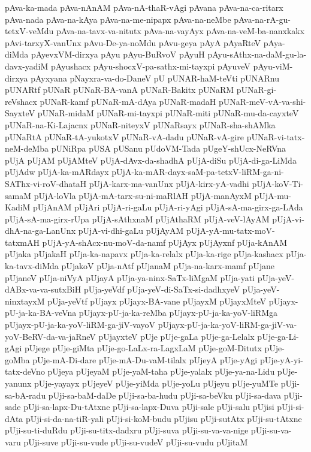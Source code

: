 {pAva-ka-mada
pAva-nAnAM
pAva-nA-thaR-vAgi
pAvana
pAva-na-ca-ritarx
pAva-nada
pAva-na-kAya
pAva-na-me-nipapx
pAva-na-neMbe
pAva-na-rA-gu-tetxV-veMdu
pAva-na-tavx-va-nitutx
pAva-na-vayAyx
pAva-na-veM-ba-nanxkakx
pAvi-tarxyX-vanUnx
pAvu-De-ya-noMdu
pAvu-geya
pAyA
pAyaRteV
pAya-diMda
pAyevxVM-dirxya
pAyu
pAyu-BuRvoV
pAyuH
pAyu-sAthx-na-daM-gu-la-davx-yadiM
pAyushacx
pAyu-shocxV-pa-sathx-mi-tayxpi
pAyuveV
pAyu-viM-dirxya
pAyxyana
pNayxra-va-do-DaneV
pU
pUNAR-haM-teVti
pUNARnu
pUNARtf
pUNaR
pUNaR-BA-vanA
pUNaR-Bakitx
pUNaRM
pUNaR-gi-reVshacx
pUNaR-kamf
pUNaR-mA-dAya
pUNaR-madaH
pUNaR-meV-vA-va-shi-SayxteV
pUNaR-midaM
pUNaR-mi-tayxpi
pUNaR-miti
pUNaR-mu-da-cayxteV
pUNaR-na-Ki-Lajacnx
pUNaR-niteyxV
pUNaRsayx
pUNaR-sha-shAMka
pUNaRtA
pUNaR-tA-yukotxV
pUNaR-vA-dadu
pUNaR-vA-gire
pUNaR-vi-tatx-neM-deMba
pUNiRpa
pUSA
pUSanu
pUdoVM-Tada
pUgeY-shUcx-NeRVna
pUjA
pUjAM
pUjAMteV
pUjA-dAvx-da-shadhA
pUjA-diSu
pUjA-di-ga-LiMda
pUjAdw
pUjA-ka-mARdayx
pUjA-ka-mAR-dayx-saM-pa-tetxV-liRM-ga-ni-SAThx-vi-roV-dhataH
pUjA-karx-ma-vanUnx
pUjA-kirx-yA-vadhi
pUjA-koV-Ti-samaM
pUjA-loVla
pUjA-mA-tarx-su-ni-maRlAH
pUjA-manAyxM
pUjA-mu-KadiM
pUjAnAM
pUjAri
pUjA-ri-gaLu
pUjA-ri-yAgi
pUjA-sA-ma-girx-ga-LAda
pUjA-sA-ma-girx-rUpa
pUjA-sAthxnaM
pUjAthaRM
pUjA-veV-lAyAM
pUjA-vi-dhA-na-ga-LanUnx
pUjA-vi-dhi-gaLu
pUjAyAM
pUjA-yA-mu-tatx-moV-tatxmAH
pUjA-yA-shAcx-nu-moV-da-namf
pUjAyx
pUjAyxnf
pUja-kAnAM
pUjaka
pUjakaH
pUja-ka-napavx
pUja-ka-relalx
pUja-ka-rige
pUja-kashacx
pUja-ka-tavx-diMda
pUjakoV
pUja-nAtf
pUjanaM
pUja-na-karx-mamf
pUjane
pUjaneV
pUja-niVyA
pUjayA
pUja-ya-ninx-SaTx-liMgaM
pUja-yati
pUja-yeV-dABx-va-va-sutxBiH
pUja-yeVdf
pUja-yeV-di-SaTx-si-dadhxyeV
pUja-yeV-ninxtayxM
pUja-yeVtf
pUjayx
pUjayx-BA-vane
pUjayxM
pUjayxMteV
pUjayx-pU-ja-ka-BA-veVna
pUjayx-pU-ja-ka-reMba
pUjayx-pU-ja-ka-yoV-liRMga
pUjayx-pU-ja-ka-yoV-liRM-ga-jiV-vayoV
pUjayx-pU-ja-ka-yoV-liRM-ga-jiV-va-yoV-BeRV-da-va-jaRneV
pUjayxteV
pUje
pUje-gaLa
pUje-ga-Lelalx
pUje-ga-Li-gAgi
pUjege
pUje-giMta
pUje-go-LaLx-ra-LagxLaM
pUje-goM-Ditutx
pUje-goMba
pUje-mA-Di-dare
pUje-mA-Du-vaM-tilalx
pUjeyA
pUje-yAgi
pUje-yA-yi-tatx-deVno
pUjeya
pUjeyaM
pUje-yaM-taha
pUje-yalalx
pUje-ya-na-Lidu
pUje-yanunx
pUje-yayayx
pUjeyeV
pUje-yiMda
pUje-yoLu
pUjeyu
pUje-yuMTe
pUji-sa-bA-radu
pUji-sa-baM-daDe
pUji-sa-ba-hudu
pUji-sa-beVku
pUji-sa-dava
pUji-sade
pUji-sa-lapx-Du-tAtxne
pUji-sa-lapx-Duva
pUji-sale
pUji-salu
pUjisi
pUji-si-dAta
pUji-si-da-na-tiR-yali
pUji-si-koM-budu
pUjisu
pUji-sutAtx
pUji-su-tAtxne
pUji-su-ti-duRdu
pUji-su-titx-dadxru
pUji-suva
pUji-su-va-va-nige
pUji-su-va-varu
pUji-suve
pUji-su-vude
pUji-su-vudeV
pUji-su-vudu
pUjitaM
}
